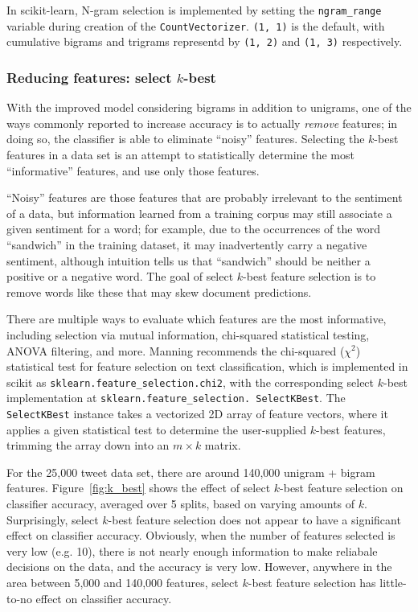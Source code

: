\documentclass[letter,12pt]{article}
\begin{document}
In scikit-learn, N-gram selection is implemented by setting the
\texttt{ngram\_range} variable during creation of the
\texttt{CountVectorizer}. \texttt{(1, 1)} is the default, with cumulative
bigrams and trigrams representd by \texttt{(1, 2)} and \texttt{(1, 3)}
respectively.

\subsubsection{Reducing features: select $k$-best}
\label{ssub:reducing_features_select_k_best}

With the improved model considering bigrams in addition to unigrams, one of the
ways commonly reported to increase accuracy is to actually \emph{remove}
features; in doing so, the classifier is able to eliminate ``noisy'' features.
Selecting the $k$-best features in a data set is an attempt to statistically
determine the most ``informative'' features, and use only those features.

``Noisy'' features are those features that are probably irrelevant to the
sentiment of a data, but information learned from a training corpus may still
associate a given sentiment for a word; for example, due to the occurrences of
the word ``sandwich'' in the training dataset, it may inadvertently carry a
negative sentiment, although intuition tells us that ``sandwich'' should be
neither a positive or a negative word. The goal of select $k$-best feature
selection is to remove words like these that may skew document predictions.

There are multiple ways to evaluate which features are the most informative,
including selection via mutual information, chi-squared statistical testing,
ANOVA filtering, and more. Manning \cite{manning08} recommends the
chi-squared ($\chi^2$) statistical test for feature selection on text
classification, which is implemented in scikit as
\texttt{sklearn.feature\_selection.chi2}, with the corresponding select
$k$-best implementation at \texttt{sklearn.feature\_selection. SelectKBest}.
The \texttt{SelectKBest} instance takes a vectorized 2D array of feature
vectors, where it applies a given statistical test to determine the
user-supplied $k$-best features, trimming the array down into an $m \times k$
matrix.

For the 25,000 tweet data set, there are around 140,000 unigram + bigram
features. Figure~\ref{fig:k_best} shows the effect of select $k$-best feature
selection on classifier accuracy, averaged over 5 splits, based on varying
amounts of $k$. Surprisingly, select $k$-best feature selection does not appear
to have a significant effect on classifier accuracy. Obviously, when the number
of features selected is very low (e.g. 10), there is not nearly enough
information to make reliabale decisions on the data, and the accuracy is very
low. However, anywhere in the area between 5,000 and 140,000 features, select
$k$-best feature selection has little-to-no effect on classifier accuracy.
\end{document}
